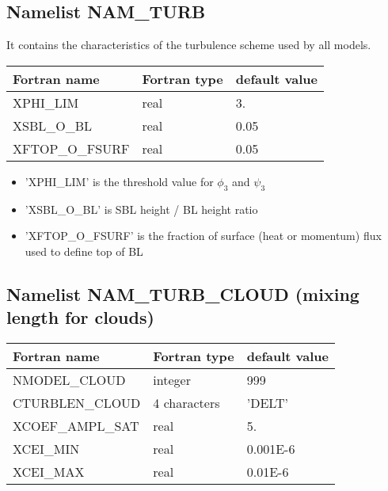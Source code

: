 \subsection{Namelist NAM\_TURB}
It contains the characteristics of the turbulence scheme used by all models.
\begin{center}
\begin{tabular}{|l|l|l| }
\hline 
 Fortran name  & Fortran type  & default value \\
\hline
 XPHI\_LIM        & real        & 3.     \\
 XSBL\_O\_BL      & real        & 0.05   \\
 XFTOP\_O\_FSURF  & real        & 0.05   \\
\hline
\end{tabular}
\end{center}

\begin{itemize}
\item 'XPHI\_LIM' is the threshold value for $\phi _{3}$ and $\psi _{3}$
\item 'XSBL\_O\_BL' is SBL height / BL height ratio
\item 'XFTOP\_O\_FSURF' is the fraction of surface (heat or momentum) flux used to define top of BL
\end{itemize}
\subsection{Namelist NAM\_TURB\_CLOUD (mixing length for clouds)}
\begin{center}
\begin{tabular}{|l|l|l| }
\hline 
 Fortran name  & Fortran type  & default value \\
\hline
 NMODEL\_CLOUD & integer       & 999           \\
 CTURBLEN\_CLOUD & 4 characters       & 'DELT'   \\
 XCOEF\_AMPL\_SAT& real        & 5.   \\
 XCEI\_MIN       & real        & 0.001E-6   \\
 XCEI\_MAX       & real        & 0.01E-6    \\
\hline
\end{tabular}
\end{center}

